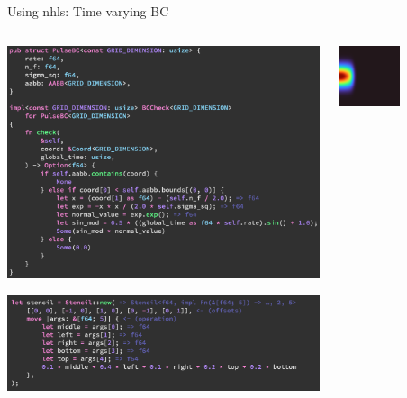 \placelogofalse
\begin{frame}{Using nhls: Time varying BC}
  \begin{columns}
  \begin{center}
  \centering
  \includegraphics[width=\textwidth]{nhls_time_vary_bc.png}

  \includegraphics[width=\textwidth]{nhls_shift_stencil.png}
  \end{center}

  \begin{center}
  \centering
  \includegraphics[width=0.5\textwidth]{frame_0006.png}


\end{center}
\end{columns}
\end{frame}
